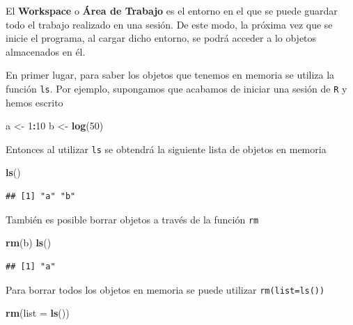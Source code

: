 \documentclass[]{book}
\newenvironment{Shaded}{\begin{snugshade}}{\end{snugshade}}
\newcommand{\KeywordTok}[1]{\textcolor[rgb]{0.13,0.29,0.53}{\textbf{#1}}}
\newcommand{\DataTypeTok}[1]{\textcolor[rgb]{0.13,0.29,0.53}{#1}}
\newcommand{\DecValTok}[1]{\textcolor[rgb]{0.00,0.00,0.81}{#1}}
\newcommand{\StringTok}[1]{\textcolor[rgb]{0.31,0.60,0.02}{#1}}
\newcommand{\OperatorTok}[1]{\textcolor[rgb]{0.81,0.36,0.00}{\textbf{#1}}}
\newcommand{\NormalTok}[1]{#1}
\begin{document}
El \textbf{Workspace} o \textbf{Área de Trabajo} es el entorno en el que
se puede guardar todo el trabajo realizado en una sesión. De este modo,
la próxima vez que se inicie el programa, al cargar dicho entorno, se
podrá acceder a lo objetos almacenados en él.

En primer lugar, para saber los objetos que tenemos en memoria se
utiliza la función \texttt{ls}. Por ejemplo, supongamos que acabamos de
iniciar una sesión de \texttt{R} y hemos escrito

\begin{Shaded}
\begin{Highlighting}[]
\NormalTok{a <-}\StringTok{ }\DecValTok{1}\OperatorTok{:}\DecValTok{10}
\NormalTok{b <-}\StringTok{ }\KeywordTok{log}\NormalTok{(}\DecValTok{50}\NormalTok{)}
\end{Highlighting}
\end{Shaded}

Entonces al utilizar \texttt{ls} se obtendrá la siguiente lista de
objetos en memoria

\begin{Shaded}
\begin{Highlighting}[]
\KeywordTok{ls}\NormalTok{()}
\end{Highlighting}
\end{Shaded}

\begin{verbatim}
## [1] "a" "b"
\end{verbatim}

También es posible borrar objetos a través de la función \texttt{rm}

\begin{Shaded}
\begin{Highlighting}[]
\KeywordTok{rm}\NormalTok{(b)}
\KeywordTok{ls}\NormalTok{()}
\end{Highlighting}
\end{Shaded}

\begin{verbatim}
## [1] "a"
\end{verbatim}

Para borrar todos los objetos en memoria se puede utilizar
\texttt{rm(list=ls())}

\begin{Shaded}
\begin{Highlighting}[]
\KeywordTok{rm}\NormalTok{(}\DataTypeTok{list =} \KeywordTok{ls}\NormalTok{())}
\end{Highlighting}
\end{Shaded}
\end{document}
